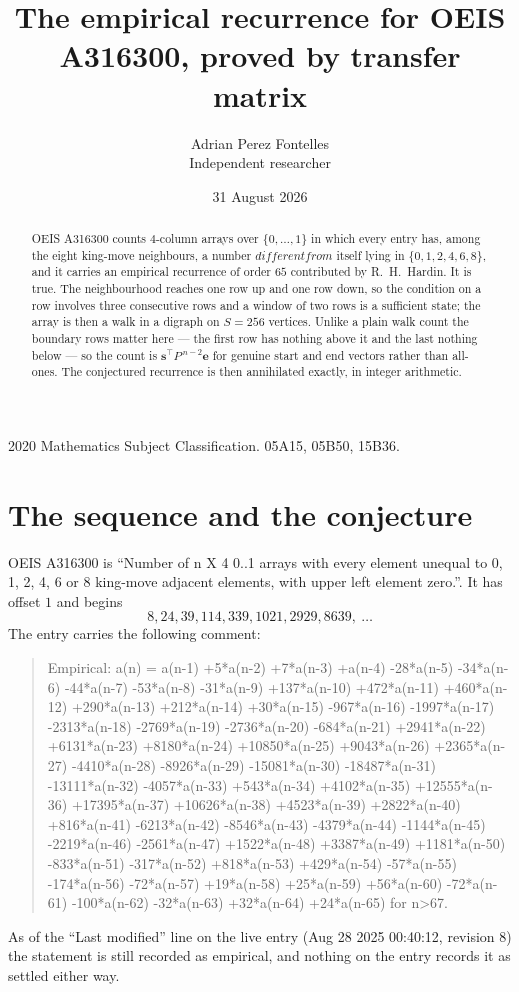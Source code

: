 \documentclass[11pt,a4paper]{article}
\title{The empirical recurrence for OEIS A316300, proved by transfer matrix}
\author{Adrian Perez Fontelles\\ \small Independent researcher}
\date{31 August 2026}
\theoremstyle{plain}
\theoremstyle{definition}
\begin{document}
\maketitle

\begin{abstract}
OEIS A316300 counts $4$-column arrays over $\{0,\dots,1\}$ in which every entry has,
among the eight king-move neighbours, a number $different from$ itself lying in $\{0,1,2,4,6,8\}$, and it carries an empirical
recurrence of order $65$ contributed by R.~H.~Hardin. It is true. The neighbourhood
reaches one row up and one row down, so the condition on a row involves three consecutive
rows and a window of two rows is a sufficient state; the array is then a walk in a digraph
on $S=256$ vertices. Unlike a plain walk count the boundary rows matter here --- the first
row has nothing above it and the last nothing below --- so the count is
$\mathbf{s}^{\!\top}P^{\,n-2}\mathbf{e}$ for genuine start and end vectors rather than
all-ones. The conjectured recurrence is then annihilated exactly, in integer arithmetic.
\end{abstract}

\noindent\small 2020 Mathematics Subject Classification. 05A15, 05B50, 15B36.\normalsize

\section{The sequence and the conjecture}

OEIS A316300 is ``Number of n X 4 0..1 arrays with every element unequal to 0, 1, 2, 4, 6 or 8 king-move adjacent elements, with upper left element zero.''. It has offset
$1$ and begins
\[
8, 24, 39, 114, 339, 1021, 2929, 8639,\ \dots
\]
The entry carries the following comment:
\begin{quote}\small
Empirical: a(n) = a(n-1) +5*a(n-2) +7*a(n-3) +a(n-4) -28*a(n-5) -34*a(n-6) -44*a(n-7) -53*a(n-8) -31*a(n-9) +137*a(n-10) +472*a(n-11) +460*a(n-12) +290*a(n-13) +212*a(n-14) +30*a(n-15) -967*a(n-16) -1997*a(n-17) -2313*a(n-18) -2769*a(n-19) -2736*a(n-20) -684*a(n-21) +2941*a(n-22) +6131*a(n-23) +8180*a(n-24) +10850*a(n-25) +9043*a(n-26) +2365*a(n-27) -4410*a(n-28) -8926*a(n-29) -15081*a(n-30) -18487*a(n-31) -13111*a(n-32) -4057*a(n-33) +543*a(n-34) +4102*a(n-35) +12555*a(n-36) +17395*a(n-37) +10626*a(n-38) +4523*a(n-39) +2822*a(n-40) +816*a(n-41) -6213*a(n-42) -8546*a(n-43) -4379*a(n-44) -1144*a(n-45) -2219*a(n-46) -2561*a(n-47) +1522*a(n-48) +3387*a(n-49) +1181*a(n-50) -833*a(n-51) -317*a(n-52) +818*a(n-53) +429*a(n-54) -57*a(n-55) -174*a(n-56) -72*a(n-57) +19*a(n-58) +25*a(n-59) +56*a(n-60) -72*a(n-61) -100*a(n-62) -32*a(n-63) +32*a(n-64) +24*a(n-65) for n>67.
\end{quote}
As of the ``Last modified'' line on the live entry (Aug 28 2025 00:40:12, revision
8) the statement is still recorded as empirical, and nothing on the entry
records it as settled either way.
\end{document}
